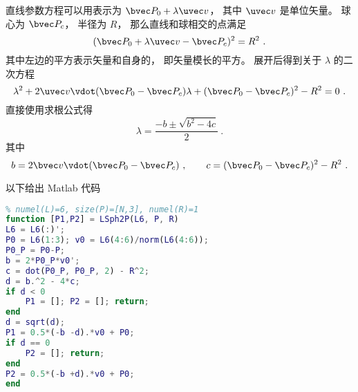 

直线参数方程可以用表示为 $\bvec P_0 + \lambda \uvec v$， 其中 $\uvec v$ 是单位矢量。 球心为 $\bvec P_c$， 半径为 $R$， 那么直线和球相交的点满足
\begin{equation}
(\bvec P_0 + \lambda \uvec v - \bvec P_c)^2 = R^2~.
\end{equation}
其中左边的平方表示矢量和自身的， 即矢量模长的平方。 展开后得到关于 $\lambda$ 的二次方程
\begin{equation}
\lambda^2 + 2\uvec v \vdot (\bvec P_0 - \bvec P_c) \lambda + (\bvec P_0 - \bvec P_c)^2 - R^2 = 0~.
\end{equation}
直接使用求根公式得
\begin{equation}
\lambda = \frac{-b \pm \sqrt{b^2 - 4c}}{2}~.
\end{equation}
其中
\begin{equation}
b = 2\bvec v \vdot (\bvec P_0 - \bvec P_c)~,
\qquad
c = (\bvec P_0 - \bvec P_c)^2 - R^2~.
\end{equation}

以下给出 Matlab 代码
\begin{lstlisting}[language=matlab, caption=LSph2P.m]
% 计算直线和球的焦点
% numel(L)=6, size(P)=[N,3], numel(R)=1
function [P1,P2] = LSph2P(L6, P, R)
L6 = L6(:)';
P0 = L6(1:3); v0 = L6(4:6)/norm(L6(4:6));
P0_P = P0-P;
b = 2*P0_P*v0';
c = dot(P0_P, P0_P, 2) - R^2;
d = b.^2 - 4*c;
if d < 0
    P1 = []; P2 = []; return;
end
d = sqrt(d);
P1 = 0.5*(-b -d).*v0 + P0;
if d == 0
    P2 = []; return;
end
P2 = 0.5*(-b +d).*v0 + P0;
end
\end{lstlisting}
